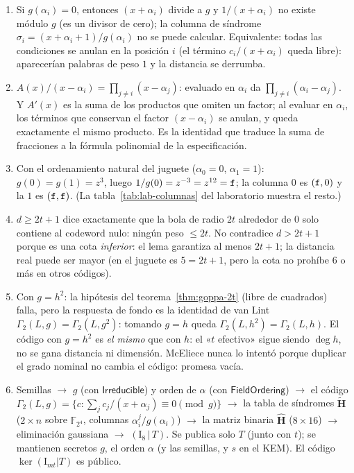 \documentclass[11pt,a4paper,oneside]{report}
\newcommand{\F}{\mathbb{F}}
\newcommand{\Hmat}{\mathbf{H}}          %
\newcommand{\FF}[1]{\F_{2^{#1}}}
\newcommand{\hx}[1]{\text{\texttt{#1}}}
\begin{document}
\begin{enumerate}[leftmargin=1.9em,itemsep=4pt]
  \item Si $g(\alpha_i)=0$, entonces $(x+\alpha_i)$ divide a $g$ y
        $1/(x+\alpha_i)$ no existe módulo $g$ (es un divisor de
        cero); la columna de síndrome
        $\sigma_i=(x+\alpha_i+1)/g(\alpha_i)$ no se puede calcular.
        Equivalente: todas las condiciones se anulan en la posición
        $i$ (el término $c_i/(x+\alpha_i)$ queda libre): aparecerían
        palabras de peso $1$ y la distancia se derrumba.
  \item $A(x)/(x-\alpha_i)=\prod_{j\neq i}(x-\alpha_j)$: evaluado
        en $\alpha_i$ da $\prod_{j\neq i}(\alpha_i-\alpha_j)$. Y
        $A'(x)$ es la suma de los productos que omiten un factor;
        al evaluar en $\alpha_i$, los términos que conservan el
        factor $(x-\alpha_i)$ se anulan, y queda exactamente el
        mismo producto. Es la identidad que traduce la suma de
        fracciones a la fórmula polinomial de la especificación.
  \item Con el ordenamiento natural del juguete ($\alpha_0=0$,
        $\alpha_1=1$): $g(0)=g(1)=z^3$, luego
        $1/g(0)=z^{-3}=z^{12}=\hx f$; la columna $0$ es
        $(\hx f,0)$ y la $1$ es $(\hx f,\hx f)$. (La
        tabla~\ref{tab:lab-columnas} del laboratorio muestra el
        resto.)
  \item $d\ge2t+1$ dice exactamente que la bola de radio $2t$
        alrededor de $0$ solo contiene al codeword nulo: ningún peso
        $\le2t$. No contradice $d>2t+1$ porque es una cota
        \emph{inferior}: el lema garantiza al menos $2t+1$; la
        distancia real puede ser mayor (en el juguete es $5=2t+1$,
        pero la cota no prohíbe $6$ o más en otros códigos).
  \item Con $g=h^2$: la hipótesis del
        teorema~\ref{thm:goppa-2t} (libre de cuadrados) falla, pero la
        respuesta de fondo es la identidad de van Lint
        $\Gamma_2(L,g)=\Gamma_2(L,g^2)$: tomando $g=h$ queda
        $\Gamma_2(L,h^2)=\Gamma_2(L,h)$. El código con $g=h^2$ es
        \emph{el mismo} que con $h$: el «$t$ efectivo» sigue siendo
        $\deg h$, no se gana distancia ni dimensión. McEliece nunca
        lo intentó porque duplicar el grado nominal no cambia el
        código: promesa vacía.
  \item Semillas $\to$ $g$ (con $\textsf{Irreducible}$) y orden de
        $\alpha$ (con $\textsf{FieldOrdering}$) $\to$ el código
        $\Gamma_2(L,g)=\{c:\sum_j c_j/(x+\alpha_j)\equiv0\pmod g\}$
        $\to$ la tabla de síndromes $\tilde{\Hmat}$ ($2\times n$
        sobre $\FF4$, columnas $\alpha_i^j/g(\alpha_i)$) $\to$ la
        matriz binaria $\hat{\Hmat}$ ($8\times16$) $\to$
        eliminación gaussiana $\to$ $(\mathrm{I}_8\,|\,T)$. Se
        publica solo $T$ (junto con $t$); se mantienen secretos $g$,
        el orden $\alpha$ (y las semillas, y $s$ en el KEM). El
        código $\ker(\mathrm{I}_{mt}|T)$ es público.
\end{enumerate}
\end{document}

